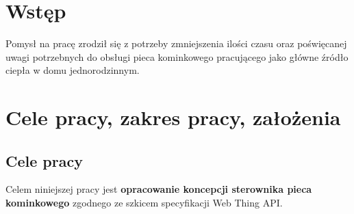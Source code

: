 \documentclass[12pt]{report}
\begin{document}
 \begin{titlepage}
 \vspace{0.1\textheight}
 \bigskip
 \vspace{0.3\textheight}
 \par

 \vspace{0.1\textheight}
 \end{titlepage}


 \tableofcontents


 \chapter*{Wstęp}

Pomysł na pracę zrodził się z potrzeby zmniejszenia ilości czasu oraz poświęcanej uwagi potrzebnych do obsługi pieca kominkowego pracującego jako główne źródło ciepła w domu jednorodzinnym.

 \chapter{Cele pracy, zakres pracy, założenia}

 \section{Cele pracy}
 Celem niniejszej pracy jest \textbf{opracowanie koncepcji sterownika pieca kominkowego} zgodnego ze szkicem specyfikacji Web Thing API.
 
\end{document}
